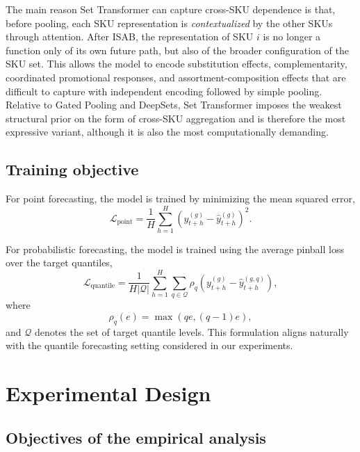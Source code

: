 \documentclass[12pt]{article}
\begin{document}
The main reason Set Transformer can capture cross-SKU dependence is that, before pooling, each SKU representation is \emph{contextualized} by the other SKUs through attention. After ISAB, the representation of SKU $i$ is no longer a function only of its own future path, but also of the broader configuration of the SKU set. This allows the model to encode substitution effects, complementarity, coordinated promotional responses, and assortment-composition effects that are difficult to capture with independent encoding followed by simple pooling. Relative to Gated Pooling and DeepSets, Set Transformer imposes the weakest structural prior on the form of cross-SKU aggregation and is therefore the most expressive variant, although it is also the most computationally demanding.

\subsection{Training objective}
\label{subsec:training_objective}

For point forecasting, the model is trained by minimizing the mean squared error,
\begin{equation}
  \mathcal{L}_{\mathrm{point}}
  =
  \frac{1}{H}
  \sum_{h=1}^{H}
  \left(
  y^{(g)}_{t+h}
  -
  \hat{y}^{(g)}_{t+h}
  \right)^2.
\end{equation}

For probabilistic forecasting, the model is trained using the average pinball loss over the target quantiles,
\begin{equation}
  \mathcal{L}_{\mathrm{quantile}}
  =
  \frac{1}{H|\mathcal{Q}|}
  \sum_{h=1}^{H}
  \sum_{q \in \mathcal{Q}}
  \rho_q
  \left(
  y^{(g)}_{t+h}
  -
  \hat{y}^{(g,q)}_{t+h}
  \right),
\end{equation}
where
\begin{equation}
  \rho_q(e)
  =
  \max(qe, (q-1)e),
\end{equation}
and $\mathcal{Q}$ denotes the set of target quantile levels. This formulation aligns naturally with the quantile forecasting setting considered in our experiments.


\section{Experimental Design}
\label{sec:experimental_design}

\subsection{Objectives of the empirical analysis}
\end{document}
